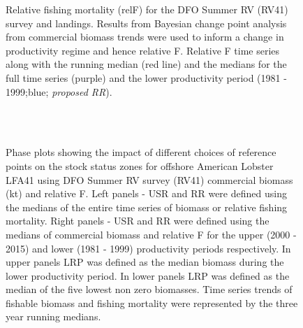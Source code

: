 \documentclass[11pt]{article}
\newcommand{\e}{/backup/bio_data/bio.lobster/figures/} %
\begin{document}
\begin{figure}
\centering
       \caption{Relative fishing mortality (relF) for the DFO Summer RV (RV41) survey and landings. Results from Bayesian change point analysis from commercial biomass trends were used to inform a change in productivity regime and hence relative F. Relative F time series along with the running median (red line) and the medians for the full time series (purple) and the lower productivity period (1981 - 1999;blue; \emph{proposed RR}). }
\end{figure}
     \clearpage


\begin{landscape}
\begin{figure}
\centering
        \\
        \\
       
       \caption{Phase plots showing the impact of different choices of reference points on the stock status zones for offshore American Lobster LFA41 using DFO Summer RV survey (RV41) commercial biomass (kt) and relative F. Left panels  - USR and RR were defined using the medians of the entire time series of biomass or relative fishing mortality. Right panels - USR and RR were defined using the medians of commercial biomass and relative F for the upper (2000 - 2015) and lower (1981 - 1999) productivity periods respectively. In upper panels LRP was defined as the median biomass during the lower productivity period. In lower panels LRP was defined as the median of the five lowest non zero biomasses. Time series trends of fishable biomass and fishing mortality were represented by the three year running medians. }

\end{figure}
\end{landscape}

\end{document}
